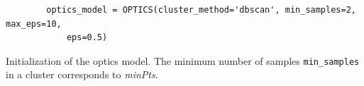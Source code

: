 \begin{listing}[htp]
    \begin{verbatim}
        optics_model = OPTICS(cluster_method='dbscan', min_samples=2, max_eps=10, 
            eps=0.5)
    \end{verbatim}
    \caption[Initialization of the \ac{optics} model]{Initialization of the \ac{optics} model.
    The minimum number of samples \texttt{min\_samples} in a cluster corresponds to \textit{minPts}.
    }
    \label{lst:optics_model}
\end{listing}
